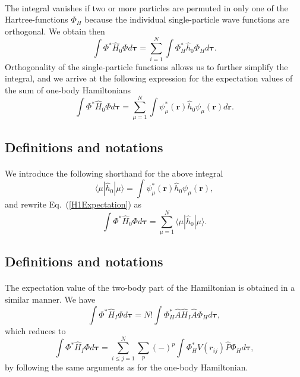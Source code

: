 \documentclass[%
twoside,                 %
final,                   %
10pt]{article}
\begin{document}
\paragraph{}
The integral vanishes if two or more particles are permuted in only one
of the Hartree-functions $\Phi_H$ because the individual single-particle wave functions are
orthogonal. We obtain then
\[
  \int \Phi^*\hat{H}_0\Phi  d\mathbf{\tau}= \sum_{i=1}^N \int \Phi_H^*\hat{h}_0\Phi_H  d\mathbf{\tau}.
\]
Orthogonality of the single-particle functions allows us to further simplify the integral, and we
arrive at the following expression for the expectation values of the
sum of one-body Hamiltonians 
\begin{equation}
  \int \Phi^*\hat{H}_0\Phi  d\mathbf{\tau}
  = \sum_{\mu=1}^N \int \psi_{\mu}^*(\mathbf{r})\hat{h}_0\psi_{\mu}(\mathbf{r})
  d\mathbf{r}.
  \label{H1Expectation}
\end{equation}



\subsection{Definitions and notations}

\paragraph{}
We introduce the following shorthand for the above integral
\[
\langle \mu | \hat{h}_0 | \mu \rangle = \int \psi_{\mu}^*(\mathbf{r})\hat{h}_0\psi_{\mu}(\mathbf{r}),
\]
and rewrite Eq.~(\ref{H1Expectation}) as
\begin{equation}
  \int \Phi^*\hat{H}_0\Phi  d\mathbf{\tau}
  = \sum_{\mu=1}^N \langle \mu | \hat{h}_0 | \mu \rangle.
  \label{H1Expectation1}
\end{equation}



\subsection{Definitions and notations}

\paragraph{}
The expectation value of the two-body part of the Hamiltonian is obtained in a
similar manner. We have
\[
  \int \Phi^*\hat{H}_I\Phi d\mathbf{\tau} 
  = N! \int \Phi_H^*\hat{A}\hat{H}_I\hat{A}\Phi_H d\mathbf{\tau},
\]
which reduces to
\[
 \int \Phi^*\hat{H}_I\Phi d\mathbf{\tau} 
  = \sum_{i\le j=1}^N \sum_{p} (-)^p\int 
  \Phi_H^*V(r_{ij})\hat{P}\Phi_H d\mathbf{\tau},
\]
by following the same arguments as for the one-body
Hamiltonian.
\end{document}
